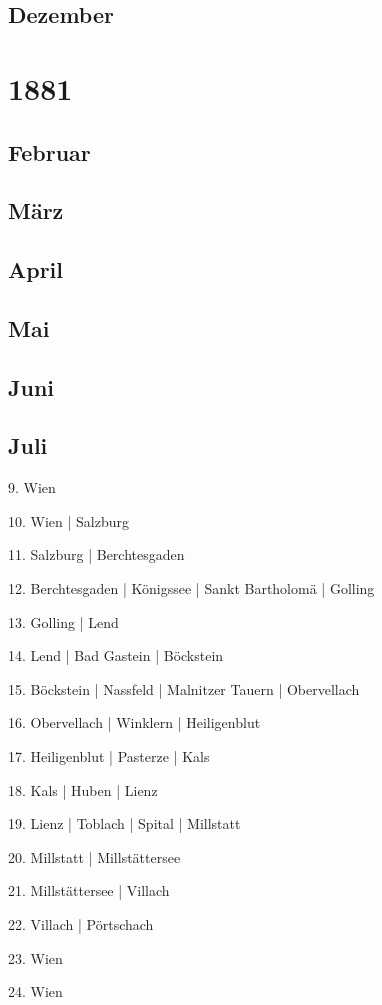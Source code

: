 \documentclass[twoside=false,titlepage=false,open=any, parskip=never, fontsize=10pt, headings=small, chapterprefix=false, appendixprefix=false, DIV=15]{scrbook}
\begin{document}
\begin{multicols}{3}
            \section*{Dezember}
            \chapter*{1881}
            \section*{Februar}
            \section*{März}
            \section*{April}
            \section*{Mai}
            \section*{Juni}
            \section*{Juli}
            9. Wien\par
            10. Wien | Salzburg\par
            11. Salzburg | Berchtesgaden\par
            12. Berchtesgaden | Königssee | Sankt Bartholomä | Golling\par
            13. Golling | Lend\par
            14. Lend | Bad Gastein | Böckstein\par
            15. Böckstein | Nassfeld | Malnitzer Tauern | Obervellach\par
            16. Obervellach | Winklern | Heiligenblut\par
            17. Heiligenblut | Pasterze | Kals\par
            18. Kals | Huben | Lienz\par
            19. Lienz | Toblach | Spital | Millstatt\par
            20. Millstatt | Millstättersee\par
            21. Millstättersee | Villach\par
            22. Villach | Pörtschach\par
            23. Wien\par
            24. Wien\par

\end{multicols}
\end{document}
